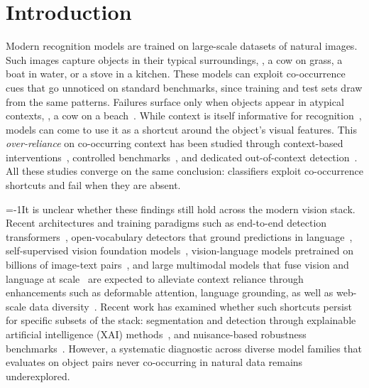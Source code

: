\section{Introduction}

Modern recognition models are trained on large-scale datasets of natural images. Such images capture objects in their typical surroundings, \eg, a cow on grass, a boat in water, or a stove in a kitchen. These models can exploit co-occurrence cues that go unnoticed on standard benchmarks, since training and test sets draw from the same patterns. Failures surface only when objects appear in atypical contexts, \eg, a cow on a beach~\cite{beery2018recognition}. While context is itself informative for recognition~\cite{torralba2003contextual,oliva2007role}, models can come to use it as a shortcut around the object's visual features. This \emph{over-reliance} on co-occurring context has been studied through context-based interventions~\cite{shetty2019not,singh2020don,chakraborty2024visual,sarridis2025mavias}, controlled benchmarks~\cite{liu2015deep,sagawa2020distributionally,li2023whac}, and dedicated out-of-context detection~\cite{acharya2022detecting,bomatter2021pigs}. All these studies converge on the same conclusion: classifiers exploit co-occurrence shortcuts and fail when they are absent.

\looseness=-1It is unclear whether these findings still hold across the modern vision stack. Recent architectures and training paradigms such as end-to-end detection transformers~\cite{carion2020end,zong2023detrs,zhang2022dino}, open-vocabulary detectors that ground predictions in language~\cite{liu2024grounding,minderer2022simple,minderer2023scaling}, self-supervised vision foundation models~\cite{caron2021emerging,oquab2024dinov,simeoni2025dinov3}, vision-language models pretrained on billions of image-text pairs~\cite{radford2021learning,cherti2023reproducible,zhai2023sigmoid,tschannen2025siglip}, and large multimodal models that fuse vision and language at scale~\cite{li2024llava} are expected to alleviate context reliance through enhancements such as deformable attention, language grounding, as well as web-scale data diversity~\cite{xia2022vision,liu2024grounding,radford2021learning}. Recent work has examined whether such shortcuts persist for specific subsets of the stack: segmentation and detection through explainable artificial intelligence (XAI) methods~\cite{dreyer2023revealing}, and nuisance-based robustness benchmarks~\cite{zhao2022ood,dunkel2025cns}. However, a systematic diagnostic across diverse model families that evaluates on object pairs never co-occurring in natural data remains underexplored.

